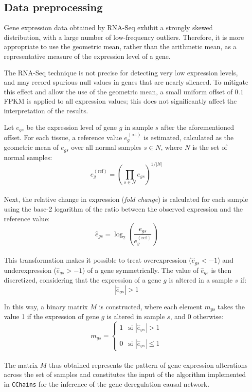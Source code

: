\documentclass[12pt,a4paper]{report}
\begin{document}
\subsection{Data preprocessing}
\label{sec:prepro}

Gene expression data obtained by RNA-Seq exhibit a strongly skewed distribution, with a large number of low-frequency outliers. Therefore, it is more appropriate to use the geometric mean, rather than the arithmetic mean, as a representative measure of the expression level of a gene.

The RNA-Seq technique is not precise for detecting very low expression levels, and may record spurious null values in genes that are nearly silenced. To mitigate this effect and allow the use of the geometric mean, a small uniform offset of \(0.1\) FPKM is applied to all expression values; this does not significantly affect the interpretation of the results\cite{biomarkers}.

Let \( e_{gs} \) be the expression level of gene \( g \) in sample \( s \) after the aforementioned offset. For each tissue, a reference value \( e_g^{(\text{ref})} \) is estimated, calculated as the geometric mean of \( e_{gs} \) over all normal samples \( s \in N \), where \( N \) is the set of normal samples\cite{biomarkers}:
\begin{equation}
e_g^{(\text{ref})} = \left( \prod_{s \in N} e_{gs} \right)^{1/|N|}
\end{equation}
\\
Next, the relative change in expression (\textit{fold change}) is calculated for each sample using the base-2 logarithm of the ratio between the observed expression and the reference value:
\begin{equation}
\hat{e}_{gs} = \log_2 \left( \frac{e_{gs}}{e_g^{(\text{ref})}} \right)
\end{equation}
\\
This transformation makes it possible to treat overexpression (\( \hat{e}_{gs} < -1 \)) and underexpression (\( \hat{e}_{gs} > -1 \)) of a gene symmetrically. The value of \( \hat{e}_{gs} \) is then discretized, considering that the expression of a gene \( g \) is altered in a sample \( s \) if:
\begin{equation}
|\hat{e}_{gs}| > 1
\end{equation}


In this way, a binary matrix \( M \) is constructed, where each element \( m_{gs} \) takes the value 1 if the expression of gene \( g \) is altered in sample \( s \), and 0 otherwise:
\begin{equation}
m_{gs} = 
\begin{cases}
1 & \text{si } |\hat{e}_{gs}| > 1 \\\\
0 & \text{si } |\hat{e}_{gs}| \leq 1
\end{cases}
\end{equation}
\\
The matrix \( M \) thus obtained represents the pattern of gene-expression alterations across the set of samples and constitutes the input of the algorithm implemented in \texttt{CChains} for the inference of the gene deregulation causal network.
\end{document}
